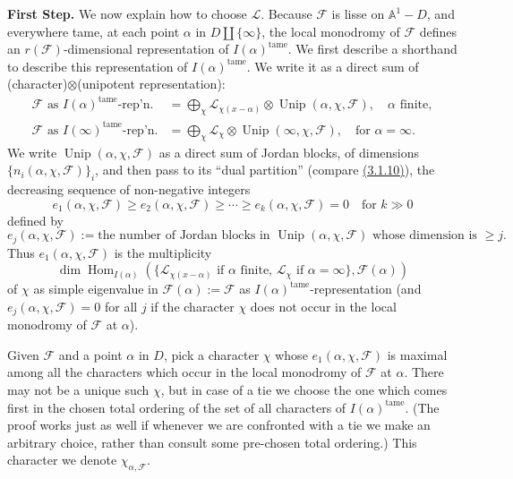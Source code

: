 \textbf{First Step.} We now explain how to choose \(\mathcal{L}\). Because
\(\mathcal{F}\) is lisse on \(\mathbb{A}^1-D\), and everywhere tame, at each
point \(\alpha\) in \(D\amalg\{\infty\}\), the local monodromy of
\(\mathcal{F}\) defines an \(r(\mathcal{F})\)-dimensional representation of
\(I(\alpha)^{\mathrm{tame}}\). We first describe a shorthand to describe this
representation of \(I(\alpha)^{\mathrm{tame}}\). We write it as a direct sum of
(character)\(\otimes\)(unipotent representation):
\[
\begin{aligned}
  \mathcal{F}\text{ as }I(\alpha)^{\mathrm{tame}}\text{-rep'n.}
  &=\bigoplus_\chi
  \mathcal{L}_{\chi(x-\alpha)}\otimes
  \operatorname{Unip}(\alpha,\chi,\mathcal{F}),\quad \alpha\text{ finite},\\
  \mathcal{F}\text{ as }I(\infty)^{\mathrm{tame}}\text{-rep'n.}
  &=\bigoplus_\chi
  \mathcal{L}_\chi\otimes\operatorname{Unip}(\infty,\chi,\mathcal{F}),
  \quad\text{for \(\alpha=\infty\)}.
\end{aligned}
\]
We write \(\operatorname{Unip}(\alpha,\chi,\mathcal{F})\) as a direct sum of
Jordan blocks, of dimensions \(\{n_i(\alpha,\chi,\mathcal{F})\}_i\), and then
pass to its ``dual partition'' (compare \hyperref[par:3.1.10]{(3.1.10)}), the
decreasing sequence of non-negative integers
\[
  e_1(\alpha,\chi,\mathcal{F})\geq e_2(\alpha,\chi,\mathcal{F})\geq\cdots
  \geq e_k(\alpha,\chi,\mathcal{F})=0\quad\text{for \(k\gg 0\)}
\]
defined by
\[
  e_j(\alpha,\chi,\mathcal{F}):=
  \text{the number of Jordan blocks in }
  \operatorname{Unip}(\alpha,\chi,\mathcal{F})
  \text{ whose dimension is \(\geq j\)}.
\]
Thus \(e_1(\alpha,\chi,\mathcal{F})\) is the multiplicity
\[
  \dim\operatorname{Hom}_{I(\alpha)}
  (\{\mathcal{L}_{\chi(x-\alpha)}\text{ if \(\alpha\) finite, }
  \mathcal{L}_\chi\text{ if \(\alpha=\infty\)}\},\mathcal{F}(\alpha))
\]
of \(\chi\) as simple eigenvalue in
\(\mathcal{F}(\alpha):=\mathcal{F}\) as \(I(\alpha)^{\mathrm{tame}}\)-representation
(and \(e_j(\alpha,\chi,\mathcal{F})=0\) for all \(j\) if the character \(\chi\)
does not occur in the local monodromy of \(\mathcal{F}\) at \(\alpha\)).

Given \(\mathcal{F}\) and a point \(\alpha\) in \(D\), pick a character
\(\chi\) whose \(e_1(\alpha,\chi,\mathcal{F})\) is maximal among all the
characters which occur in the local monodromy of \(\mathcal{F}\) at \(\alpha\).
There may not be a unique such \(\chi\), but in case of a tie we choose the one
which comes first in the chosen total ordering of the set of all characters of
\(I(\alpha)^{\mathrm{tame}}\). (The proof works just as well if whenever we
are confronted with a tie we make an arbitrary choice, rather than consult some
pre-chosen total ordering.) This character we denote \(\chi_{\alpha,\mathcal{F}}\).

